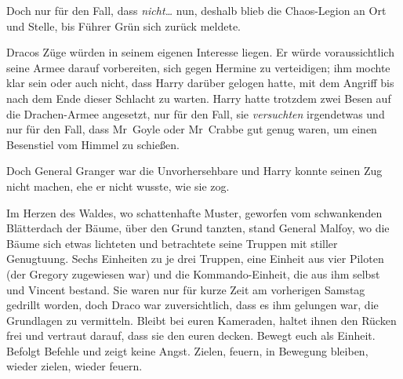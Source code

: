 Doch nur für den Fall, dass \emph{nicht…} nun, deshalb blieb die Chaos-Legion an Ort und Stelle, bis Führer Grün sich zurück meldete.

Dracos Züge würden in seinem eigenen Interesse liegen. Er würde voraussichtlich seine Armee darauf vorbereiten, sich gegen Hermine zu verteidigen; ihm mochte klar sein oder auch nicht, dass Harry darüber gelogen hatte, mit dem Angriff bis nach dem Ende dieser Schlacht zu warten. Harry hatte trotzdem zwei Besen auf die Drachen-Armee angesetzt, nur für den Fall, sie \emph{versuchten} irgendetwas und nur für den Fall, dass Mr~Goyle oder Mr~Crabbe gut genug waren, um einen Besenstiel vom Himmel zu schießen.

Doch General Granger war die Unvorhersehbare und Harry konnte seinen Zug nicht machen, ehe er nicht wusste, wie sie zog.

\later

Im Herzen des Waldes, wo schattenhafte Muster, geworfen vom schwankenden Blätterdach der Bäume, über den Grund tanzten, stand General Malfoy, wo die Bäume sich etwas lichteten und betrachtete seine Truppen mit stiller Genugtuung. Sechs Einheiten zu je drei Truppen, eine Einheit aus vier Piloten (der Gregory zugewiesen war) und die Kommando-Einheit, die aus ihm selbst und Vincent bestand. Sie waren nur für kurze Zeit am vorherigen Samstag gedrillt worden, doch Draco war zuversichtlich, dass es ihm gelungen war, die Grundlagen zu vermitteln. Bleibt bei euren Kameraden, haltet ihnen den Rücken frei und vertraut darauf, dass sie den euren decken. Bewegt euch als Einheit. Befolgt Befehle und zeigt keine Angst. Zielen, feuern, in Bewegung bleiben, wieder zielen, wieder feuern.

